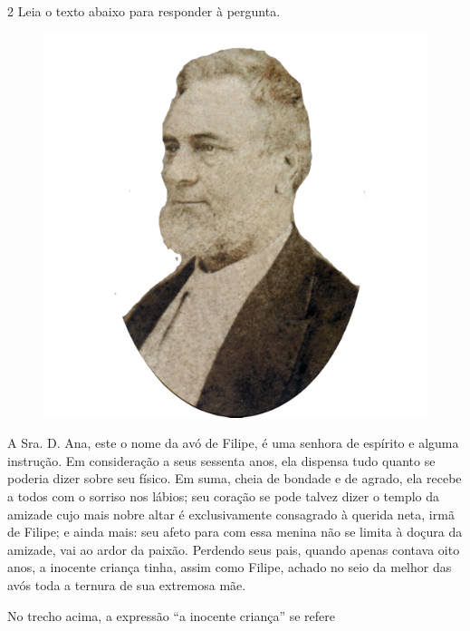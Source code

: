 \num{2} Leia o texto abaixo para responder à pergunta.

\begin{myquote}

\begin{figure}[H]
\centering
\includegraphics[scale=0.25]{./imgSAEB_7_POR/media/image56.png}
\end{figure}

A Sra. D. Ana, este o nome da avó de Filipe, é uma senhora de espírito e
alguma instrução. Em consideração a seus sessenta anos, ela dispensa tudo
quanto se poderia dizer sobre seu físico. Em suma, cheia de bondade e de
agrado, ela recebe a todos com o sorriso nos lábios; seu coração se pode
talvez dizer o templo da amizade cujo mais nobre altar é exclusivamente
consagrado à querida neta, irmã de Filipe; e ainda mais: seu afeto para com
essa menina não se limita à doçura da amizade, vai ao ardor da paixão.
Perdendo seus pais, quando apenas contava oito anos, a inocente criança tinha,
assim como Filipe, achado no seio da melhor das avós toda a ternura de sua
extremosa mãe.


\end{myquote}

No trecho acima, a expressão ``a inocente criança'' se refere

